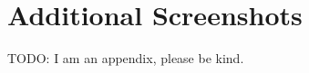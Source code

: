 \titleformat{\chapter}{\normalfont\huge\bfseries}{\IfAppendix{\appendixname\,\thechapter:\hspace{-14pt} }{\thechapter}}{14pt}{}
\chapter{Additional Screenshots}

TODO: I am an appendix, please be kind.